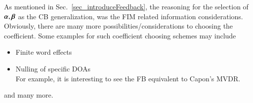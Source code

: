 As mentioned in Sec.~\ref{sec_introduceFeedback}, the reasoning for the selection of $\boldsymbol{\alpha}, \boldsymbol{\beta}$ as the CB generalization, was the FIM related information considerations.
Obviously, there are many more possibilities/considerations to choosing the coefficient.
Some examples for such coefficient choosing schemes may include
\begin{itemize}
    \item Finite word effects
    \item Nulling of specific DOAs \\
    For example, it is interesting to see the FB equivalent to Capon's \cite{capon1969high} MVDR. 
\end{itemize}
and many more.